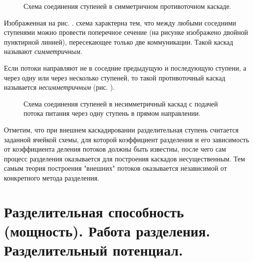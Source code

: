 \begin{figure}[ht]
  \caption{Схема соединения ступеней в симметричном противоточном каскаде.}\label{image2}
\end{figure}

Изображенная на рис. \cite{image2}. схема характерна тем, что между любыми соседними ступенями можно провести поперечное сечение (на рисунке изображено двойной пунктирной линией), пересекающее только две коммуникации. Такой каскад называют \textit{симметричным.}

Если потоки направляют не в соседние предыдущую и последующую ступени, а через одну или через несколько ступеней, то такой противоточный каскад называется \textit{несимметричным} (рис. \cite{unsymmetr}).

\begin{figure}[ht]
  \caption{Схема соединения ступеней в несимметричный каскад с подачей потока питания через одну ступень в прямом направлении.}\label{unsymmetr}
\end{figure}


Отметим, что при внешнем каскадировании разделительная ступень считается заданной ячейкой схемы, для которой коэффициент разделения и его зависимость от коэффициента деления потоков должны быть известны, после чего сам процесс разделения оказывается для построения каскадов несущественным. Тем самым теория построения "внешних" потоков оказывается независимой от конкретного метода разделения.

\section{Разделительная способность (мощность). Работа  разделения. Разделительный потенциал.}

